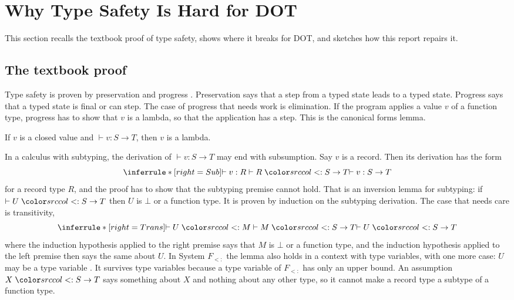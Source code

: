 \mathsrc
\section{Why Type Safety Is Hard for DOT}\label{sec:problem}

This section recalls the textbook proof of type safety, shows where it breaks for DOT, and sketches how this report repairs it.

\subsection{The textbook proof}\label{sec:textbook}

Type safety is proven by preservation and progress \cite{wright1994syntactic}. Preservation says that a step from a typed state leads to a typed state. Progress says that a typed state is final or can step. The case of progress that needs work is elimination. If the program applies a value $v$ of a function type, progress has to show that $v$ is a lambda, so that the application has a step. This is the canonical forms lemma.

\begin{lemma}
If $v$ is a closed value and $\vdash v : S \to T$, then $v$ is a lambda.
\end{lemma}

In a calculus with subtyping, the derivation of $\vdash v : S \to T$ may end with subsumption. Say $v$ is a record. Then its derivation has the form
\[
\inferrule*[right=Sub]{\vdash v : R \\ \vdash R \sub S \to T}{\vdash v : S \to T}
\]
for a record type $R$, and the proof has to show that the subtyping premise cannot hold. That is an inversion lemma for subtyping: if $\vdash U \sub S \to T$ then $U$ is $\bot$ or a function type. It is proven by induction on the subtyping derivation. The case that needs care is transitivity,
\[
\inferrule*[right=Trans]{\vdash U \sub M \\ \vdash M \sub S \to T}{\vdash U \sub S \to T}
\]
where the induction hypothesis applied to the right premise says that $M$ is $\bot$ or a function type, and the induction hypothesis applied to the left premise then says the same about $U$. In System $F_{<:}$ the lemma also holds in a context with type variables, with one more case: $U$ may be a type variable \cite{pierce2002tapl}. It survives type variables because a type variable of $F_{<:}$ has only an upper bound. An assumption $X \sub S \to T$ says something about $X$ and nothing about any other type, so it cannot make a record type a subtype of a function type.

